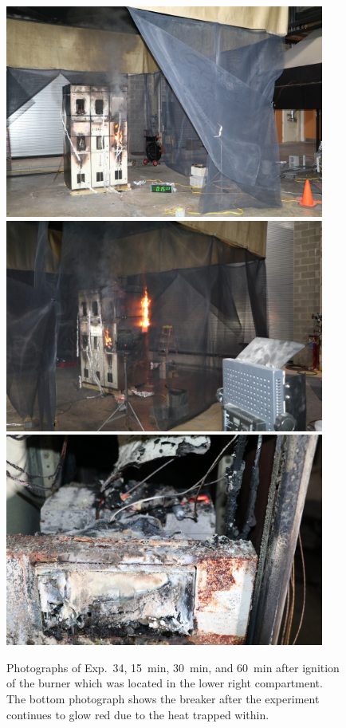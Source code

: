 \begin{figure}[p]
\centering
\includegraphics[height=2.75in]{../FIGURES/Test_34_15_min} \\
\includegraphics[height=2.75in]{../FIGURES/Test_34_30_min} \\
\includegraphics[height=2.75in]{../FIGURES/Test_34_60_min}
\caption[Photographs of Exp.~34]{Photographs of Exp.~34, 15~min, 30~min, and 60~min after ignition of the burner which was located in the lower right compartment. The bottom photograph shows the breaker after the experiment continues to glow red due to the heat trapped within.}
\label{fig:Test_34_photos}
\end{figure}


